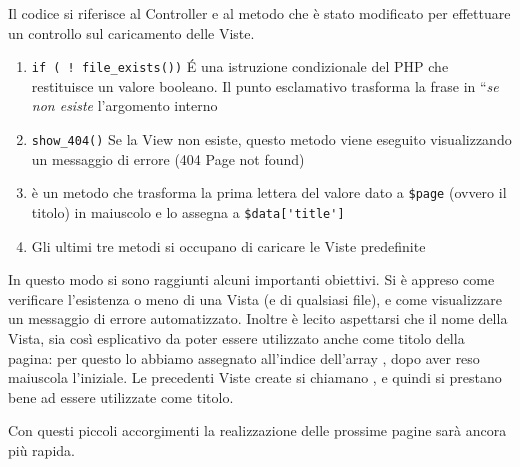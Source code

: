 Il codice si riferisce al Controller  e al metodo  che è stato modificato per effettuare un controllo sul caricamento delle Viste.

\begin{enumerate}
\item \verb|if ( ! file_exists())| \'E una istruzione condizionale del \ac{PHP} che restituisce un valore booleano. Il punto esclamativo trasforma la frase in ``\emph{se non esiste} l'argomento interno
\item \verb|show_404()| Se la View non esiste, questo metodo viene eseguito visualizzando un messaggio di errore (404 Page not found)
\item {} è un metodo che trasforma la prima lettera del valore dato a \verb|$page| (ovvero il titolo) in maiuscolo e lo assegna a \verb|$data['title']|
\item Gli ultimi tre metodi si occupano di caricare le Viste predefinite
\end{enumerate}

In questo modo si sono raggiunti alcuni importanti obiettivi. Si è appreso come verificare l'esistenza o meno di una Vista (e di qualsiasi file), e come visualizzare un messaggio di errore automatizzato. Inoltre è lecito aspettarsi che il nome della Vista, sia così esplicativo da poter essere utilizzato anche come titolo della pagina: per questo lo abbiamo assegnato all'indice  dell'array , dopo aver reso maiuscola l'iniziale. Le precedenti Viste create si chiamano ,  e quindi si prestano bene ad essere utilizzate come titolo.

Con questi piccoli accorgimenti la realizzazione delle prossime pagine sarà ancora più rapida.